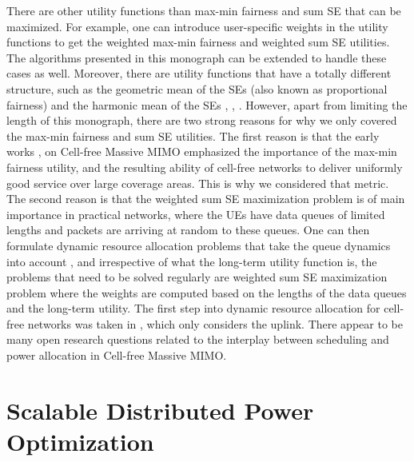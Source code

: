 \begin{remark}
There are other utility functions than max-min fairness and sum SE that can be maximized. For example, one can introduce user-specific weights in the utility functions to get the weighted max-min fairness and weighted sum SE utilities. The algorithms presented in this monograph can be extended to handle these cases as well.
Moreover, there are utility functions that have a totally different structure, such as the geometric mean of the SEs (also known as proportional fairness) and the harmonic mean of the SEs \cite{Bjornson2013d}, \cite{Farooq2020a}, \cite{Luo2008a}.
However, apart from limiting the length of this monograph, there are two strong reasons for why we only covered the max-min fairness and sum SE utilities.
The first reason is that the early works  \cite{Nayebi2017a}, \cite{Ngo2017b} on Cell-free Massive MIMO emphasized the importance of the max-min fairness utility, and the resulting ability of cell-free networks to deliver uniformly good service over large coverage areas. This is why we considered that metric.
The second reason is that the weighted sum SE maximization problem is of main importance in practical networks, where the UEs have data queues of limited lengths and packets are arriving at random to these queues.
One can then formulate dynamic resource allocation problems that take the queue dynamics into account \cite{Georgiadis2006a}, \cite{Shirani2010a} and irrespective of what the long-term utility function is, the problems that need to be solved regularly are weighted sum SE maximization problem where the weights are computed based on the lengths of the data queues and the long-term utility. The first step into dynamic resource allocation for cell-free networks was taken in \cite{Chen2020b}, which only considers the uplink. There appear to be many open research questions related to the interplay between scheduling and power allocation in Cell-free Massive MIMO.
\end{remark}






\section{Scalable Distributed Power Optimization}
\label{sec:scalable-power-allocation}

